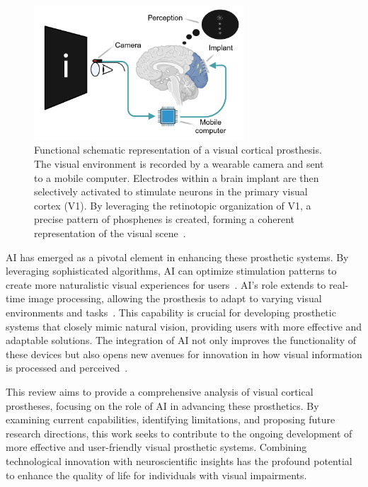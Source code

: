 \documentclass[twocolumn,10pt]{article}
\begin{document}
\begin{figure}[hbt!]
      \centering
      \includegraphics[width=0.7\textwidth]{imgs/visual_cortical_prothesis.png}
      \caption{Functional schematic representation of a visual cortical
            prosthesis. The visual environment is recorded by a wearable camera
            and sent to a mobile computer. Electrodes within a brain implant are
            then selectively activated to stimulate neurons in the primary
            visual cortex (V1). By leveraging the retinotopic organization of
            V1, a precise pattern of phosphenes is created, forming a coherent
            representation of the visual scene~\cite{chenShapePerceptionHighchannelcount2020}.}\label{fig:schematic}
\end{figure}

AI has emerged as a pivotal element in enhancing these prosthetic systems. By
leveraging sophisticated algorithms, AI can optimize stimulation patterns to
create more naturalistic visual experiences for
users~\cite{kriegeskorteDeepNeuralNetworks2015}. AI's role extends to real-time
image processing, allowing the prosthesis to adapt to varying visual
environments and tasks~\cite{marblestoneIntegrationDeepLearning2016}. This
capability is crucial for developing prosthetic systems that closely mimic
natural vision, providing users with more effective and adaptable solutions. The
integration of AI not only improves the functionality of these devices but also
opens new avenues for innovation in how visual information is processed and
perceived~\cite{gallettiCorticalConnectionsArea2001}.

This review aims to provide a comprehensive analysis of visual cortical
prostheses, focusing on the role of AI in advancing these prosthetics. By
examining current capabilities, identifying limitations, and proposing future
research directions, this work seeks to contribute to the ongoing development of
more effective and user-friendly visual prosthetic systems. Combining
technological innovation with neuroscientific insights has the profound
potential to enhance the quality of life for individuals with visual
impairments.
\end{document}
